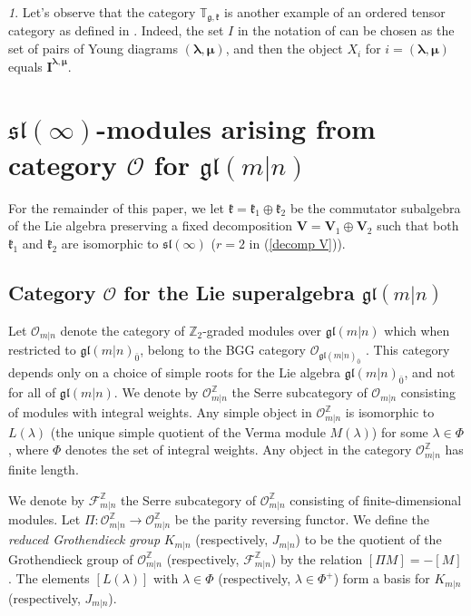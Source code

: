 \documentclass[12pt,oneside,english]{amsart}
\numberwithin{equation}{section}
\numberwithin{figure}{section}
\theoremstyle{plain}
\theoremstyle{plain}
\theoremstyle{remark}
\newtheorem{rem}[thm]{\protect\remarkname}
\theoremstyle{definition}
\theoremstyle{plain}
\theoremstyle{remark}
\theoremstyle{definition}
\theoremstyle{plain}
\theoremstyle{plain}
\theoremstyle{definition}
\providecommand{\remarkname}{Remark}
\newcommand{\bV}{\mathbf{V}}
\newcommand{\bI}{\mathbf{I}}
\newcommand{\fg}{\mathfrak{g}}
\newcommand{\fk}{\mathfrak{k}}
\begin{document}
\begin{rem}
Let's observe that the category $\mathbb T_{\fg,\fk}$ is another example of an ordered tensor category as defined in \cite{CP1}. Indeed, the set $I$ in the notation of \cite{CP1} can be chosen as the set of pairs of Young diagrams $({{\boldsymbol{\lambda}},{\boldsymbol{\mu}}})$, and then the object $X_i$ for $i=({{\boldsymbol{\lambda}},{\boldsymbol{\mu}}})$ equals  $\bI^{\boldsymbol{\lambda},{\boldsymbol{\mu}}}$.
\end{rem}



\section{$\mathfrak{sl}(\infty)$-modules arising from category $\mathcal O$ for $\mathfrak{gl}(m|n)$}\label{super}


For the remainder of this paper, we let $\fk=\fk_1\oplus\fk_2$ be the commutator subalgebra of the Lie algebra preserving a fixed decomposition $\bV=\bV_1\oplus\bV_2$ such that both $\fk_1$ and $\fk_2$ are isomorphic to $\mathfrak{sl}(\infty)$ ($r=2$ in (\ref{decomp V})).

\subsection{Category $\mathcal{O}$ for the Lie superalgebra $\mathfrak{gl}(m|n)$}\label{cat O}



Let $\mathcal{O}_{m|n}$ denote the category of $\mathbb{Z}_{2}$-graded
modules over $\mathfrak{gl}(m|n)$ which when restricted to $\mathfrak{gl}(m|n)_{\bar{0}}$,
belong to the BGG category $\mathcal{O}_{\mathfrak{gl}(m|n)_{\bar{0}}}$  \cite[Section 8.2.3]{M}.
This category depends only on a choice of simple roots for the Lie
algebra $\mathfrak{gl}(m|n)_{\bar{0}}$, and not for all of $\mathfrak{gl}(m|n)$. We denote by $\mathcal{O}_{m|n}^{\mathbb{Z}}$ the Serre subcategory of $\mathcal{O}_{m|n}$
consisting of modules with integral weights. Any simple object in $\mathcal{O}_{m|n}^{\mathbb{Z}}$ is isomorphic
to $L\left(\lambda\right)$ (the unique simple quotient of the Verma
module $M\left(\lambda\right)$) for some $\lambda\in \Phi$, where $\Phi$ denotes the set of integral weights.
Any object in the category $\mathcal{O}_{m|n}^{\mathbb{Z}}$
has finite length.

We denote by $\mathcal{F}_{m|n}^{\mathbb{Z}}$ the Serre subcategory of $\mathcal{O}_{m|n}^{\mathbb{Z}}$
consisting of finite-dimensional modules. Let $\Pi:\mathcal{O}_{m|n}^{\mathbb{Z}}\rightarrow\mathcal{O}_{m|n}^{\mathbb{Z}}$ be the parity reversing functor.
We define the {\em reduced Grothendieck group} $K_{m|n}$ (respectively, $J_{m|n}$) to be the quotient of the Grothendieck group of  $\mathcal{O}_{m|n}^{\mathbb{Z}}$  (respectively, $\mathcal{F}_{m|n}^{\mathbb{Z}}$) by the relation $[\Pi M]=-[M]$.
The elements $\left[L\left(\lambda\right)\right]$ with $\lambda\in \Phi$ (respectively, $\lambda\in \Phi^+$) form a basis for $K_{m|n}$ (respectively, $J_{m|n}$).
\end{document}
